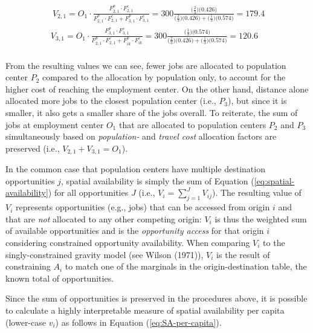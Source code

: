 \documentclass[]{elsarticle} %
\begin{document}
\begin{equation}
\label{eq:SA-2populations}
\begin{array}{l}\
V_{2,1} = O_1\cdot \frac{F^p_{2,1} \cdot F^c_{2,1}}{F^p_{2,1} \cdot F^c_{2,1} + F^p_{3,1} \cdot F^c_{3,1}} = 300 \frac{\big(\frac{2}{3} \big) \big(0.426 \big)}{\big(\frac{2}{3} \big) \big(0.426 \big) + \big(\frac{1}{3} \big) \big(0.574 \big)} = 179.4\\
V_{3,1} = O_1\cdot \frac{F^p_{3,1} \cdot F^c_{3,1}}{F^p_{2,1} \cdot F^c_{2,1} + F^p_{ik} \cdot F^c_{ik}} = 300 \frac{\big(\frac{1}{3} \big) \big(0.574 \big)}{\big(\frac{2}{3} \big) \big(0.426 \big) + \big(\frac{1}{3} \big) \big(0.574 \big)}  =  120.6 \\
\end{array}
\end{equation}

From the resulting values we can see, fewer jobs are allocated to
population center \(P_2\) compared to the allocation by population only,
to account for the higher cost of reaching the employment center. On the
other hand, distance alone allocated more jobs to the closest population
center (i.e., \(P_3\)), but since it is smaller, it also gets a smaller
share of the jobs overall. To reiterate, the sum of jobs at employment
center \(O_1\) that are allocated to population centers \(P_2\) and
\(P_3\) simultaneously based on \emph{population-} and \emph{travel
cost} allocation factors are preserved (i.e.,
\(V_{2,1} + V_{3,1} = O_1\)).

In the common case that population centers have multiple destination
opportunities \(j\), spatial availability is simply the sum of Equation
(\ref{eq:spatial-availability}) for all opportunities \(J\) (i.e.,
\(V_i = \sum_{j=1}^J V_{ij}\)). The resulting value of \(V_i\)
represents opportunities (e.g., jobs) that can be accessed from origin
\(i\) and that are \emph{not} allocated to any other competing origin:
\(V_i\) is thus the weighted sum of available opportunities and is the
\emph{opportunity access} for that origin \(i\) considering constrained
opportunity availability. When comparing \(V_i\) to the
singly-constrained gravity model (see Wilson (1971)), \(V_i\) is the
result of constraining \(A_i\) to match one of the marginals in the
origin-destination table, the known total of opportunities.

Since the sum of opportunities is preserved in the procedures above, it
is possible to calculate a highly interpretable measure of spatial
availability per capita (lower-case \(v_i\)) as follows in Equation
(\ref{eq:SA-per-capita}).
\end{document}
